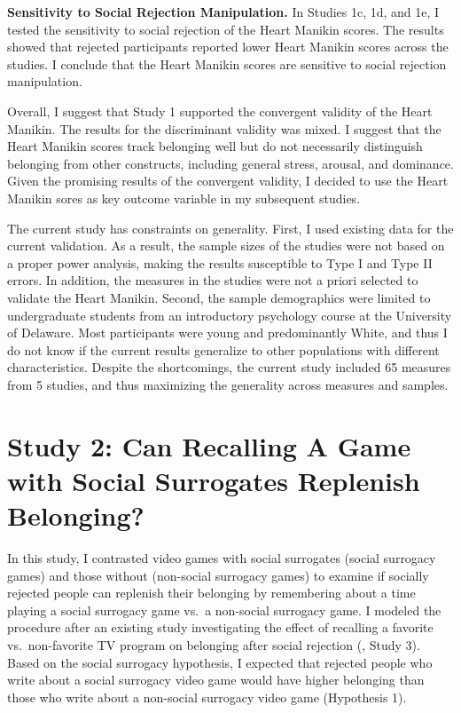 \documentclass[
]{udthesis}
\begin{document}
\textbf{Sensitivity to Social Rejection Manipulation.} In Studies 1c, 1d, and
1e, I tested the sensitivity to social rejection of the Heart Manikin
scores. The results showed that rejected participants reported lower
Heart Manikin scores across the studies. I conclude that the Heart
Manikin scores are sensitive to social rejection manipulation.

Overall, I suggest that Study 1 supported the convergent validity of
the Heart Manikin. The results for the discriminant validity was mixed.
I suggest that the Heart Manikin scores track
belonging well but do not necessarily distinguish belonging from other
constructs, including general stress, arousal, and dominance.
Given the promising results of the convergent validity,
I decided to use the Heart Manikin sores as key outcome variable in my subsequent studies.

The current study has constraints on generality. First, I used existing
data for the current validation. As a result, the sample sizes of the
studies were not based on a proper power analysis, making the results
susceptible to Type I and Type II errors. In addition, the measures in
the studies were not a priori selected to validate the Heart Manikin.
Second, the sample demographics were limited to undergraduate students
from an introductory psychology course at the University of Delaware.
Most participants were young and predominantly White, and thus I do not
know if the current results generalize to other populations with different
characteristics.
Despite the shortcomings, the current
study included 65 measures from 5 studies, and thus maximizing the
generality across measures and samples.

\chapter{Study 2: Can Recalling A Game with Social Surrogates Replenish Belonging?}\label{study-2-can-recalling-a-game-with-social-surrogates-replenish-belonging}

In this study, I contrasted video games with social surrogates (social surrogacy games) and those without (non-social surrogacy games) to examine if socially rejected people can replenish their belonging by remembering about a time playing a social surrogacy game vs.~a non-social surrogacy game. I modeled the procedure after an existing study investigating the effect of recalling a favorite vs.~non-favorite TV program on belonging after social rejection (, Study 3). Based on the social surrogacy hypothesis, I expected that rejected people who write about a social surrogacy video game would have higher belonging than those who write about a non-social surrogacy video game (Hypothesis 1).
\end{document}
